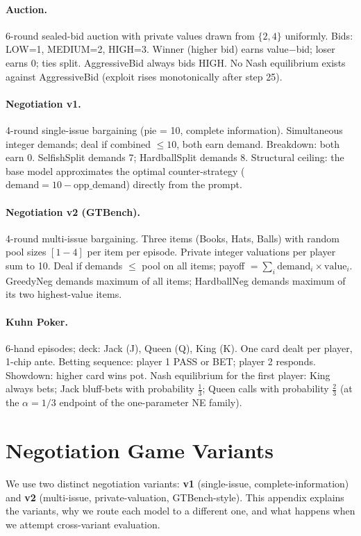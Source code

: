 \documentclass[letterpaper]{article} %
\begin{document}
\paragraph{Auction.} 6-round sealed-bid auction with private values drawn from $\{2, 4\}$ uniformly. Bids: LOW=1, MEDIUM=2, HIGH=3. Winner (higher bid) earns value$-$bid; loser earns 0; ties split. AggressiveBid always bids HIGH. No Nash equilibrium exists against AggressiveBid (exploit rises monotonically after step 25).
\paragraph{Negotiation v1.} 4-round single-issue bargaining (pie = 10, complete information). Simultaneous integer demands; deal if combined $\leq 10$, both earn demand. Breakdown: both earn 0. SelfishSplit demands 7; HardballSplit demands 8. Structural ceiling: the base model approximates the optimal counter-strategy ($\text{demand} = 10 - \text{opp\_demand}$) directly from the prompt.
\paragraph{Negotiation v2 (GTBench).} 4-round multi-issue bargaining. Three items (Books, Hats, Balls) with random pool sizes $[1{-}4]$ per item per episode. Private integer valuations per player sum to 10. Deal if demands $\leq$ pool on all items; payoff $= \sum_i \text{demand}_i \times \text{value}_i$. GreedyNeg demands maximum of all items; HardballNeg demands maximum of its two highest-value items.
\paragraph{Kuhn Poker.} 6-hand episodes; deck: Jack (J), Queen (Q), King (K). One card dealt per player, 1-chip ante. Betting sequence: player 1 PASS or BET; player 2 responds. Showdown: higher card wins pot. Nash equilibrium for the first player: King always bets; Jack bluff-bets with probability $\frac{1}{3}$; Queen calls with probability $\frac{2}{3}$ (at the $\alpha{=}1/3$ endpoint of the one-parameter NE family).
\section{Negotiation Game Variants}
\label{app:negotiation-variants}
We use two distinct negotiation variants: \textbf{v1} (single-issue, complete-information) and \textbf{v2} (multi-issue, private-valuation, GTBench-style). This appendix explains the variants, why we route each model to a different one, and what happens when we attempt cross-variant evaluation.
\end{document}
